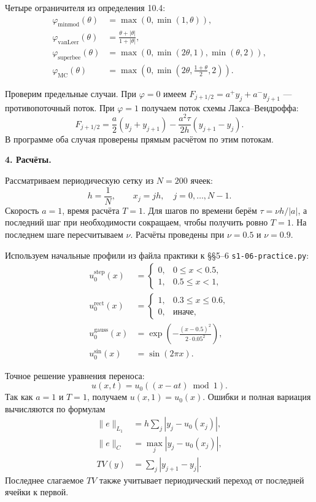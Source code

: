 \documentclass[12pt]{article}
\begin{document}
\noindent Четыре ограничителя из определения 10.4:
\begin{align*}
 \varphi_{\mathrm{minmod}}(\theta)&=\max(0,\min(1,\theta)),\\
 \varphi_{\mathrm{vanLeer}}(\theta)&=\frac{\theta+|\theta|}{1+|\theta|},\\
 \varphi_{\mathrm{superbee}}(\theta)&=\max(0,\min(2\theta,1),\min(\theta,2)),\\
 \varphi_{\mathrm{MC}}(\theta)&=\max\left(0,\min\left(2\theta,\frac{1+\theta}{2},2\right)\right).
\end{align*}

\noindent Проверим предельные случаи. При $\varphi=0$ имеем
$F_{j+1/2}=a^+y_j+a^-y_{j+1}$ --- противопоточный поток.
При $\varphi=1$ получаем поток схемы Лакса--Вендроффа:
\begin{equation}
 F_{j+1/2}=\frac{a}{2}(y_j+y_{j+1})-
 \frac{a^2\tau}{2h}(y_{j+1}-y_j).
\end{equation}
В программе оба случая проверены прямым расчётом по этим потокам.

\bigskip
\noindent\textbf{4. Расчёты.}

\noindent Рассматриваем периодическую сетку из $N=200$ ячеек:
\begin{equation}
 h=\frac{1}{N},\qquad x_j=jh,
 \quad j=0,\ldots,N-1.
\end{equation}
Скорость $a=1$, время расчёта $T=1$. Для шагов по времени
берём $\tau=\nu h/|a|$, а последний шаг при необходимости сокращаем,
чтобы получить ровно $T=1$. На последнем шаге пересчитываем $\nu$.
Расчёты проведены при $\nu=0.5$ и $\nu=0.9$.

\noindent Используем начальные профили из файла практики к §§5--6
\texttt{s1-06-practice.py}:
\begin{align*}
 u_0^{\mathrm{step}}(x)&=\begin{cases}0,&0\le x<0.5,\\1,&0.5\le x<1,\end{cases}\\
 u_0^{\mathrm{rect}}(x)&=\begin{cases}1,&0.3\le x\le0.6,\\0,&\text{иначе},\end{cases}\\
 u_0^{\mathrm{gauss}}(x)&=\exp\left(-\frac{(x-0.5)^2}{2\cdot0.05^2}\right),\\
 u_0^{\mathrm{sin}}(x)&=\sin(2\pi x).
\end{align*}

\noindent Точное решение уравнения переноса:
\begin{equation}
 u(x,t)=u_0((x-at)\bmod 1).
\end{equation}
Так как $a=1$ и $T=1$, получаем $u(x,1)=u_0(x)$.
Ошибки и полная вариация вычисляются по формулам
\begin{align*}
 \|e\|_{L_1}&=h\sum_j|y_j-u_0(x_j)|,\\
 \|e\|_C&=\max_j|y_j-u_0(x_j)|,\\
 TV(y)&=\sum_j|y_{j+1}-y_j|.
\end{align*}
Последнее слагаемое $TV$ также учитывает периодический переход
от последней ячейки к первой.
\end{document}
